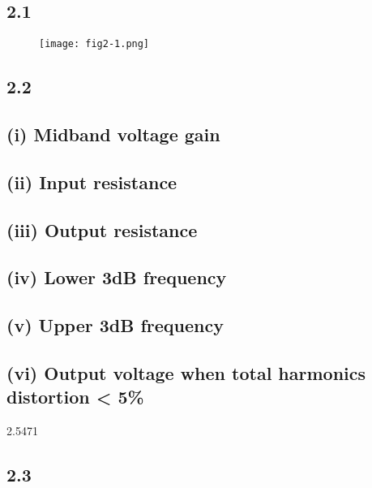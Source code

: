 \subsection*{2.1}
    \begin{figure}[h!]
        \centering
        \texttt{[image: fig2-1.png]}
    \end{figure}    

\subsection*{2.2}
  \subsection*{(i) Midband voltage gain}
  \subsection*{(ii) Input resistance}
  \subsection*{(iii) Output resistance}
  \subsection*{(iv) Lower 3dB frequency}
  \subsection*{(v) Upper 3dB frequency}
  \subsection*{(vi) Output voltage when total harmonics distortion < 5\%}
  2.5471
  
\subsection*{2.3}
  